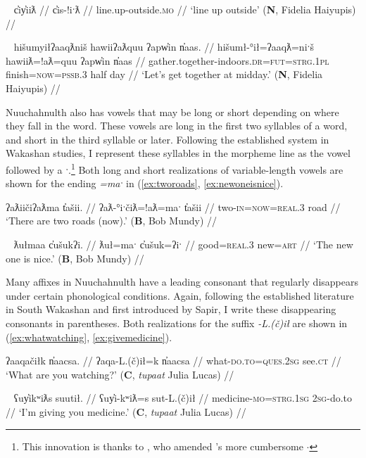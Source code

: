 \ex~ \label{ex:lineupoutside}
\begingl
\glpreamble c̓iy̓iiƛ //
\gla c̓is-!iˑƛ //
\glb line.up-outside.\textsc{mo} //
\glft `line up outside' (\textbf{N}, Fidelia Haiyupis) //
\endgl
\xe

\ex~ \label{ex:gatherindoors}
\begingl
\glpreamble hišumyiłʔaaqƛniš hawiiʔaƛquu ʔapw̓in n̓aas. //
\gla hišumł-°ił=ʔaaqƛ=niˑš hawiiƛ=!aƛ=quu ʔapw̓in n̓aas //
\glb gather.together-indoors.\textsc{dr}=\textsc{fut}=\textsc{strg.1pl} finish=\textsc{now}=\textsc{pssb.3} half day //
\glft `Let's get together at midday.' (\textbf{N}, Fidelia Haiyupis) //
\endgl
\xe

Nuuchahnulth also has vowels that may be long or short depending on where they fall in the word. These vowels are long in the first two syllables of a word, and short in the third syllable or later. Following the established system in Wakashan studies, I represent these syllables in the morpheme line as the vowel followed by a ˑ.\footnote{This innovation is thanks to \citealt{rose1981}, who amended \citealt{sapir1939}'s more cumbersome \u{$\cdot$}} Both long and short realizations of variable-length vowels are shown for the ending \textit{=maˑ} in (\ref{ex:tworoads}, \ref{ex:newoneisnice}).

\ex \label{ex:tworoads}
\begingl
\glpreamble ʔaƛiičiʔaƛma t̓ašii. //
\gla ʔaƛ-°iˑčiƛ=!aƛ=maˑ t̓ašii //
\glb two-\textsc{in}=\textsc{now}=\textsc{real.3} road //
\glft `There are two roads (now).' (\textbf{B}, Bob Mundy) //
\endgl
\xe

\ex~ \label{ex:newoneisnice}
\begingl
\glpreamble ƛułmaa c̓ušukʔi. //
\gla ƛuł=maˑ c̓ušuk=ʔiˑ //
\glb good=\textsc{real.3} new=\textsc{art} //
\glft `The new one is nice.' (\textbf{B}, Bob Mundy) //
\endgl
\xe

Many affixes in Nuuchahnulth have a leading consonant that regularly disappears under certain phonological conditions. Again, following the established literature in South Wakashan and first introduced by Sapir, I write these disappearing consonants in parentheses. Both realizations for the suffix \textit{-L.(č)ił} are shown in (\ref{ex:whatwatching}, \ref{ex:givemedicine}).

\ex \label{ex:whatwatching}
\begingl
\glpreamble ʔaaqačiłk n̓aacsa. //
\gla ʔaqa-L.(č)ił=k n̓aacsa //
\glb what-\textsc{do.to}=\textsc{ques.2sg} see.\textsc{ct} //
\glft `What are you watching?' (\textbf{C}, \textit{tupaat} Julia Lucas) //
\endgl
\xe

\ex~ \label{ex:givemedicine}
\begingl
\glpreamble ʕuy̓ikʷiƛs suutił. //
\gla ʕuy̓i-kʷiƛ\footnotemark=s sut-L.(č)ił //
\glb medicine-\textsc{mo}=\textsc{strg.1sg} \textsc{2sg}-do.to //
\glft `I'm giving you medicine.' (\textbf{C}, \textit{tupaat} Julia Lucas) //
\endgl
\xe

